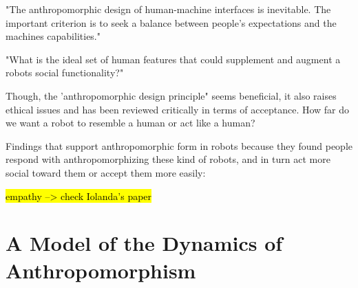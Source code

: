 \documentclass[lettersize, apacite, twoside, HRI]{apa_HRI}
\begin{document}
	

	"The anthropomorphic design of human-machine interfaces is inevitable. The important criterion is to seek a balance between people's expectations and the machines capabilities." \cite{duffy_anthropomorphism_2002}

	"What is the ideal set of human features that could supplement and augment a robots  social functionality?" \cite{duffy_anthropomorphism_2002}


	Though, the 'anthropomorphic design principle" seems beneficial, it also raises ethical issues and has been reviewed critically in terms of acceptance. How far do we want a robot to resemble a human or act like a human?

	Findings that support anthropomorphic form in robots because they found people respond with anthropomorphizing these kind of robots, and in turn act more social toward them or accept them more easily:

	\hl{empathy --> check Iolanda's paper}

	
	
%
%
%
%
%
%

\section{A Model of the Dynamics of Anthropomorphism}
\label{sec:dynamics_model}
\end{document}
